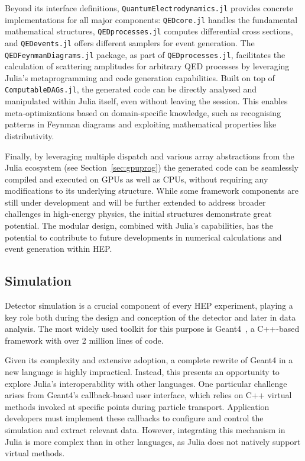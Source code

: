 \documentclass{webofc}
\begin{document}
Beyond its interface definitions, \texttt{QuantumElectrodynamics.jl} provides
concrete implementations for all major components: \texttt{QEDcore.jl} handles
the fundamental mathematical structures, \texttt{QEDprocesses.jl} computes
differential cross sections, and \texttt{QEDevents.jl} offers different samplers
for event generation. The \texttt{QEDFeynmanDiagrams.jl} package, as part of
\texttt{QEDprocesses.jl}, facilitates the calculation of scattering amplitudes
for arbitrary QED processes by leveraging Julia's metaprogramming and code
generation capabilities. Built on top of \texttt{ComputableDAGs.jl}, the
generated code can be directly analysed and manipulated within Julia itself,
even without leaving the session. This enables meta-optimizations based on
domain-specific knowledge, such as recognising patterns in Feynman diagrams and
exploiting mathematical properties like distributivity.

Finally, by leveraging multiple dispatch and various array abstractions from the
Julia ecosystem (see Section~\ref{sec:gpuprog}) the generated
code can be seamlessly compiled and executed on GPUs as well as CPUs,
without requiring any modifications to its underlying structure. While some
framework components are still under development and will be further extended to
address broader challenges in high-energy physics, the initial structures
demonstrate great potential. The modular design, combined with Julia's
capabilities, has the potential to contribute to future developments in
numerical calculations and event generation within HEP.


\subsection{Simulation}
\label{sec:simulation}

Detector simulation is a crucial component of every HEP
experiment, playing a key role both during the design and conception of the
detector and later in data analysis. The most widely used toolkit for this
purpose is Geant4~\cite{GEANT4:2002zbu}, a C++-based framework with over 2
million lines of code.

Given its complexity and extensive adoption, a complete rewrite of Geant4 in a
new language is highly impractical. Instead, this presents an opportunity to
explore Julia's interoperability with other languages. One particular challenge
arises from Geant4's callback-based user interface, which relies on C++ virtual
methods invoked at specific points during particle transport. Application
developers must implement these callbacks to configure and control the
simulation and extract relevant data. However, integrating this
mechanism in Julia is more complex than in other languages, as Julia does not
natively support virtual methods.
\end{document}
